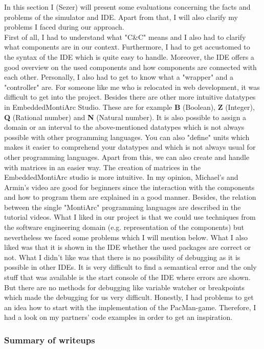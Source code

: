 In this section I (Sezer) will present some evaluations concerning the facts and problems of the simulator and IDE. Apart from that, I will also clarify my problems I faced during our approach.
\\
First of all, I had to understand what "C\&C" means and I also had to clarify what components are in our context. Furthermore, I had to get accustomed to the syntax of the IDE which is quite easy to handle. Moreover, the IDE offers a good overview on the used components and how components are connected with each other. Personally, I also had to get to know what a "wrapper" and a "controller" are. For someone like me who is relocated in web development, it was difficult to get into the project. Besides there are other more intuitive datatypes in EmbeddedMontiArc Studio. These are for example \textbf{B} (Boolean), \textbf{Z} (Integer), \textbf{Q} (Rational number) and \textbf{N} (Natural number). It is also possible to assign  a domain or an interval to the above-mentioned datatypes which is not always possible with other programming languages. You can also "define" units which makes it easier to comprehend your datatypes and which is not always usual for other programming languages. Apart from this, we can also create and handle with matrices in an easier way. The creation of matrices in the EmbeddedMontiArc studio is more intuitive. In my opinion, Michael's and Armin's video are good for beginners since the interaction with the components and how to program them are explained in a good manner. Besides, the relation between the single "MontiArc" programming languages are described in the tutorial videos. What I liked in our project is that we could use techniques from the software engineering domain (e.g. representation of the components) but nevertheless we faced some problems which I will mention below. What I also liked was that it is shown in the IDE whether the used packages are correct or not. What I didn't like was that there is no possibility of debugging as it is possible in other IDEs. It is very difficult to find a semantical error and the only stuff that was available is the start console of the IDE where errors are shown. But there are no methods for debugging like variable watcher or breakpoints which made the debugging for us very difficult. Honestly, I had problems to get an idea how to start with the implementation of the PacMan-game. Therefore, I had a look on my partners' code examples in order to get an inspiration. 

\subsubsection{Summary of writeups}